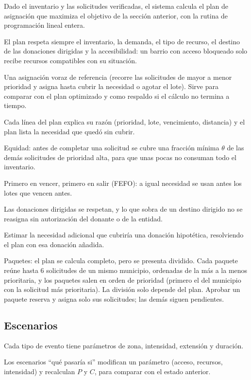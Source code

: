 \begin{description}[leftmargin=0pt]
  \item[RM-18 (\Must).] Dado el inventario y las solicitudes verificadas, el sistema calcula el plan de asignación que maximiza el objetivo de la sección anterior, con la rutina de programación lineal entera.
  \item[RM-19 (\Must).] El plan respeta siempre el inventario, la demanda, el tipo de recurso, el destino de las donaciones dirigidas y la accesibilidad: un barrio con acceso bloqueado solo recibe recursos compatibles con su situación.
  \item[RM-20 (\Should).] Una asignación voraz de referencia (recorre las solicitudes de mayor a menor prioridad y asigna hasta cubrir la necesidad o agotar el lote). Sirve para comparar con el plan optimizado y como respaldo si el cálculo no termina a tiempo.
  \item[RM-27 (\Must).] Cada línea del plan explica su razón (prioridad, lote, vencimiento, distancia) y el plan lista la necesidad que quedó sin cubrir.
  \item[RM-28 (\Should).] Equidad: antes de completar una solicitud se cubre una fracción mínima $\theta$ de las demás solicitudes de prioridad alta, para que unas pocas no consuman todo el inventario.
  \item[RM-29 (\Should).] Primero en vencer, primero en salir (FEFO): a igual necesidad se usan antes los lotes que vencen antes.
  \item[RM-30 (\Should).] Las donaciones dirigidas se respetan, y lo que sobra de un destino dirigido no se reasigna sin autorización del donante o de la entidad.
  \item[RM-31 (\Could).] Estimar la necesidad adicional que cubriría una donación hipotética, resolviendo el plan con esa donación añadida.
  \item[RM-33 (\Must).] Paquetes: el plan se calcula completo, pero se presenta dividido. Cada paquete reúne hasta 6 solicitudes de un mismo municipio, ordenadas de la más a la menos prioritaria, y los paquetes salen en orden de prioridad (primero el del municipio con la solicitud más prioritaria). La división solo depende del plan. Aprobar un paquete reserva y asigna solo sus solicitudes; las demás siguen pendientes.
\end{description}

\subsection{Escenarios}
\begin{description}[leftmargin=0pt]
  \item[RM-21 (\Must).] Cada tipo de evento tiene parámetros de zona, intensidad, extensión y duración.
  \item[RM-22 (\Could).] Los escenarios ``qué pasaría si'' modifican un parámetro (acceso, recursos, intensidad) y recalculan $P$ y $C$, para comparar con el estado anterior.
\end{description}
